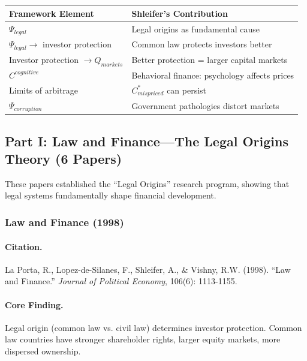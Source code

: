 \begin{center}
\renewcommand{\arraystretch}{1.2}
\small
\begin{tabular}{ll}
\hline
\textbf{Framework Element} & \textbf{Shleifer's Contribution} \\
\hline
$\Psi_{legal}$ & Legal origins as fundamental cause \\
$\Psi_{legal} \to$ investor protection & Common law protects investors better \\
Investor protection $\to Q_{markets}$ & Better protection = larger capital markets \\
$C^{cognitive}$ & Behavioral finance: psychology affects prices \\
Limits of arbitrage & $C^*_{mispriced}$ can persist \\
$\Psi_{corruption}$ & Government pathologies distort markets \\
\hline
\end{tabular}
\end{center}

\subsection{Part I: Law and Finance---The Legal Origins Theory (6 Papers)}

These papers established the ``Legal Origins'' research program, showing that
legal systems fundamentally shape financial development.

\subsubsection{Law and Finance (1998)}

\paragraph{Citation.}
La Porta, R., Lopez-de-Silanes, F., Shleifer, A., \& Vishny, R.W. (1998).
``Law and Finance.'' \emph{Journal of Political Economy}, 106(6): 1113-1155.

\paragraph{Core Finding.}
Legal origin (common law vs. civil law) determines investor protection.
Common law countries have stronger shareholder rights, larger equity markets,
more dispersed ownership.

